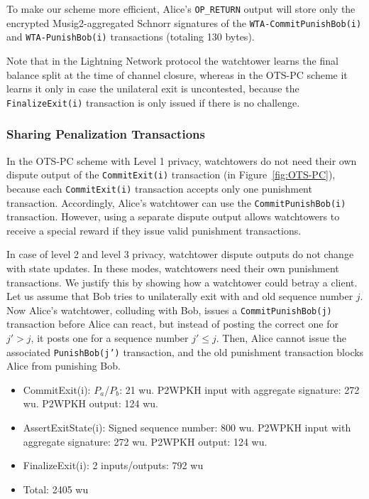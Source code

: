 \documentclass[11pt,a4paper]{article}
\newcommand{\txname}[1]{\texttt{#1}}
\begin{document}
To make our scheme more efficient, Alice’s \txname{OP\_RETURN} output will store only the encrypted Musig2-aggregated Schnorr signatures of the \txname{WTA-CommitPunishBob(i)} and \txname{WTA-PunishBob(i)} transactions (totaling 130 bytes). 

Note that in the Lightning Network protocol the watchtower learns the final balance split at the time of channel closure, whereas in the OTS-PC scheme it learns it only in case the unilateral exit is uncontested, because the \txname{FinalizeExit(i)} transaction is only issued if there is no challenge.

\subsubsection{Sharing Penalization Transactions}

In the OTS-PC scheme with Level 1 privacy, watchtowers do not need their own dispute output of the \txname{CommitExit(i)} transaction (in Figure~\ref{fig:OTS-PC}), because each \txname{CommitExit(i)} transaction accepts only one punishment transaction. Accordingly, Alice's watchtower can use the \txname{CommitPunishBob(i)} transaction.
However, using a separate dispute output allows watchtowers to receive a special reward if they issue valid punishment transactions.

In case of level 2 and level 3 privacy, watchtower dispute outputs do not change with state updates. In these modes,  watchtowers need their own punishment transactions. We justify this by showing how a watchtower could betray a client. Let us assume that Bob tries to unilaterally exit with and old sequence number $j$. Now Alice's watchtower, colluding with Bob, issues a \txname{CommitPunishBob(j)} transaction before Alice can react, but instead of posting the correct one for $j' > j$, it posts one for a sequence number $j' \leq j$. Then, Alice cannot issue the associated \txname{PunishBob(j')} transaction, and the old punishment transaction blocks Alice from punishing Bob.



\begin{itemize}

    \item CommitExit(i): $P_a$/$P_b$: 21 wu. P2WPKH input with aggregate signature: 272 wu. P2WPKH output: 124 wu.
    
    \item AssertExitState(i): Signed sequence number: 800 wu. P2WPKH input with aggregate
    signature: 272 wu. P2WPKH output: 124 wu.
    
    \item FinalizeExit(i): 2 inputs/outputs: 792 wu
    \item Total: 2405 wu
\end{itemize}
\end{document}
